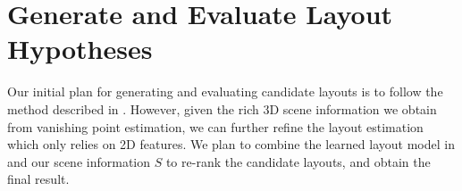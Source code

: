 \section{Generate and Evaluate Layout Hypotheses}
\label{sec:4}

Our initial plan for generating and evaluating candidate layouts is to follow the method described in \cite{Hedau_ICCV2009}. However, given the rich 3D scene information we obtain from vanishing point estimation, we can further refine the layout estimation which only relies on 2D features. We plan to combine the learned layout model in \cite{Hedau_ICCV2009} and our scene information $S$ to re-rank the candidate layouts, and obtain the final result.

